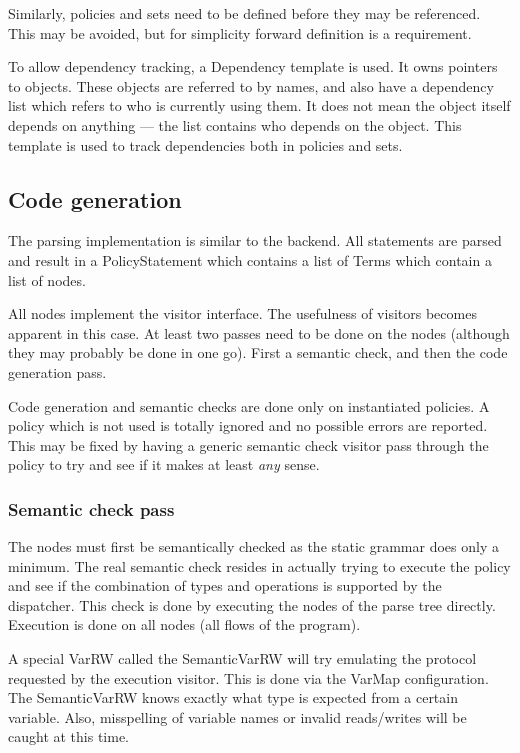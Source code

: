 \documentclass{article}
\begin{document}
Similarly, policies and sets need to be defined before they may be referenced.
This may be avoided, but for simplicity forward definition is a requirement.

To allow dependency tracking, a Dependency template is used. It owns pointers to
objects. These objects are referred to by names, and also have a dependency list
which refers to who is currently using them. It does not mean the object itself
depends on anything --- the list contains who depends on the object. This
template is used to track dependencies both in policies and sets.

\subsection{Code generation}
The parsing implementation is similar to the backend. All statements are parsed
and result in a PolicyStatement which contains a list of Terms which contain a
list of nodes.

All nodes implement the visitor interface. The usefulness of visitors becomes
apparent in this case. At least two passes need to be done on the nodes
(although they may probably be done in one go). First a semantic check, and then
the code generation pass.

Code generation and semantic checks are done only on instantiated policies. A
policy which is not used is totally ignored and no possible errors are reported.
This may be fixed by having a generic semantic check visitor pass through the
policy to try and see if it makes at least {\em any} sense.

\subsubsection{Semantic check pass}
The nodes must first be semantically checked as the static grammar does only a
minimum. The real semantic check resides in actually trying to execute the
policy and see if the combination of types and operations is supported by the
dispatcher. This check is done by executing the nodes of the parse tree directly.
Execution is done on all nodes (all flows of the program).

A special VarRW called the SemanticVarRW will try emulating the protocol
requested by the execution visitor. This is done via the VarMap configuration.
The SemanticVarRW knows exactly what type is expected from a certain variable.
Also, misspelling of variable names or invalid reads/writes will be caught at
this time.
\end{document}
